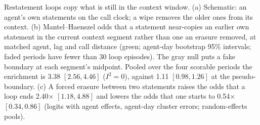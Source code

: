 \caption{Restatement loops copy what is still in the context window.
(a) Schematic: an agent's own statements on the call clock; a wipe removes the older ones from its context.
(b) Mantel--Haenszel odds that a statement near-copies an earlier own statement in the current context segment rather than one an erasure removed, at matched agent, lag and call distance (green; agent-day bootstrap 95\% intervals; faded periods have fewer than 30 loop episodes). The gray null puts a fake boundary at each segment's midpoint. Pooled over the four scorable periods the enrichment is 3.38 $[2.56, 4.46]$ ($I^2=0$), against 1.11 $[0.98, 1.26]$ at the pseudo-boundary.
(c) A forced erasure between two statements raises the odds that a loop ends 2.40$\times$ $[1.18, 4.88]$ and lowers the odds that one starts to 0.54$\times$ $[0.34, 0.86]$ (logits with agent effects, agent-day cluster errors; random-effects pools).}
\label{fig:H69}
